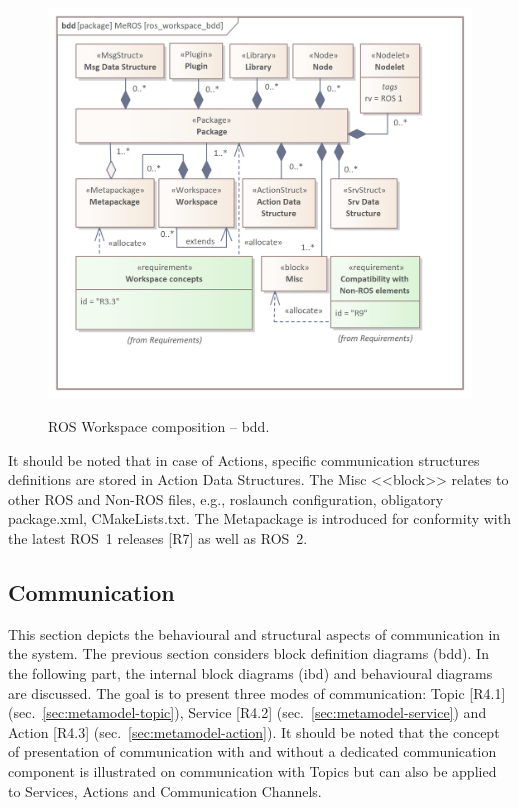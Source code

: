 \documentclass{ieeeaccess}
\begin{document}
	\begin{figure}[htb]
		\centering
		\begin{center}
			{\includegraphics[scale=0.7]{img/meros_pkg/ros_workspace_bdd.png}}
		\end{center}
		\caption{ROS Workspace composition -- bdd.} 
		\label{fig:ros_workspace_bdd}
	\end{figure}
	
	It should be noted that in case of Actions, specific communication structures definitions are stored in Action Data Structures. The Misc <<block>> relates to other ROS and Non-ROS files, e.g., roslaunch configuration, obligatory package.xml, CMakeLists.txt. The Metapackage is introduced for conformity with the latest ROS~1 releases [R7] as well as ROS~2. 
		

	
	
	
\subsection{Communication}
\label{sec:metamodel-communication}
	
	This section depicts the behavioural and structural aspects of communication in the system. The previous section considers block definition diagrams (bdd). In the following part, the internal block diagrams (ibd) and behavioural diagrams are discussed. The goal is to present three modes of communication: Topic [R4.1] (sec.~\ref{sec:metamodel-topic}), Service [R4.2] (sec.~\ref{sec:metamodel-service}) and Action [R4.3] (sec.~\ref{sec:metamodel-action}). It should be noted that the concept of presentation of communication with and without a dedicated communication component is illustrated on communication with Topics but can also be applied to Services, Actions and Communication Channels.
	
\end{document}
